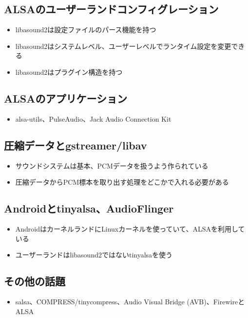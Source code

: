 \documentclass[mingoth,a4paper]{jsarticle}
\begin{document}
\subsection{ALSAのユーザーランドコンフィグレーション}

\begin{itemize}
\item libasound2は設定ファイルのパース機能を持つ
\item libasound2はシステムレベル、ユーザーレベルでランタイム設定を変更できる
\item libasound2はプラグイン構造を持つ
\end{itemize}

\subsection{ALSAのアプリケーション}
\begin{itemize}
\item alsa-utils、PulseAudio、Jack Audio Connection Kit
\end{itemize}

\subsection{圧縮データとgstreamer/libav}
\begin{itemize}
\item サウンドシステムは基本、PCMデータを扱うよう作られている
\item 圧縮データからPCM標本を取り出す処理をどこかで入れる必要がある
\end{itemize}

\subsection{Androidとtinyalsa、AudioFlinger}
\begin{itemize}
\item AndroidはカーネルランドにLinuxカーネルを使っていて、ALSAを利用している
\item ユーザーランドはlibasound2ではないtinyalsaを使う
\end{itemize}

\subsection{その他の話題}
\begin{itemize}
\item salsa、COMPRESS/tinycompress、Audio Visual Bridge (AVB)、FirewireとALSA
\end{itemize}
\end{document}

